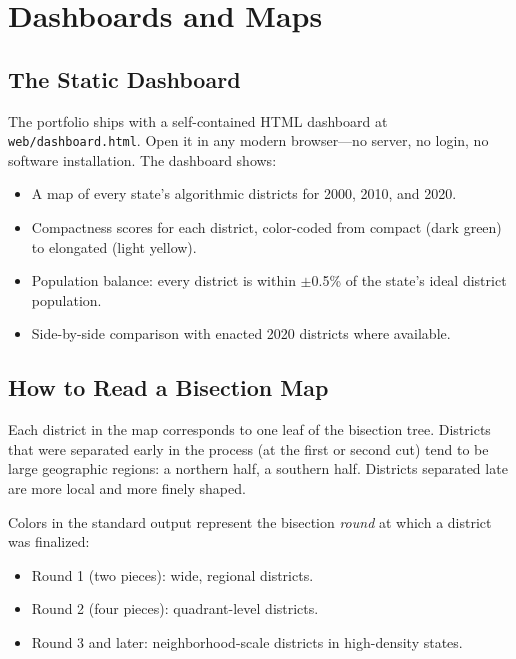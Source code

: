 
\section{Dashboards and Maps}

\subsection*{The Static Dashboard}

The portfolio ships with a self-contained HTML dashboard at
\texttt{web/dashboard.html}.
Open it in any modern browser---no server, no login, no software installation.
The dashboard shows:

\begin{itemize}
  \item A map of every state's algorithmic districts for 2000, 2010, and 2020.
  \item Compactness scores for each district, color-coded from compact
        (dark green) to elongated (light yellow).
  \item Population balance: every district is within $\pm$0.5\% of the
        state's ideal district population.
  \item Side-by-side comparison with enacted 2020 districts where available.
\end{itemize}

\subsection*{How to Read a Bisection Map}

Each district in the map corresponds to one leaf of the bisection tree.
Districts that were separated early in the process (at the first or second
cut) tend to be large geographic regions: a northern half, a southern half.
Districts separated late are more local and more finely shaped.

Colors in the standard output represent the bisection \emph{round} at which
a district was finalized:
\begin{itemize}
  \item Round 1 (two pieces): wide, regional districts.
  \item Round 2 (four pieces): quadrant-level districts.
  \item Round 3 and later: neighborhood-scale districts in high-density states.
\end{itemize}

